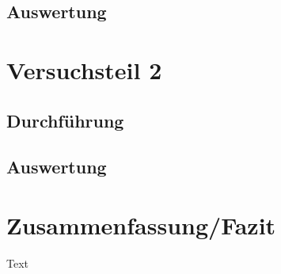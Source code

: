 \documentclass[11pt]{scrartcl}
\begin{document}
\subsection{Auswertung}


\section{Versuchsteil 2}



\subsection{Durchführung}



\subsection{Auswertung}




\section{Zusammenfassung/Fazit}

Text
\end{document}
